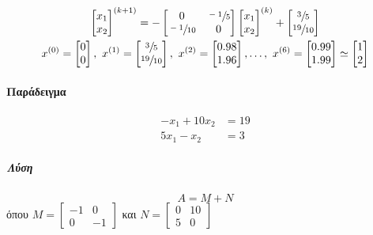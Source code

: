 \documentclass[11pt,a4paper,notitlepage,fleqn]{article}
\begin{document}
\begin{gather*}
	\left[\begin{matrix}
	x_1\\x_2
	\end{matrix}\right]^{(k+1)} = -\left[\begin{matrix}
	0 & \sfrac{-1}{5} \\ \sfrac{-1}{10} & 0
	\end{matrix}\right] \left[\begin{matrix}
	x_1\\x_2
	\end{matrix}\right]^{(k)} + \left[\begin{matrix}
	\sfrac{3}{5} \\ \sfrac{19}{10} 
	\end{matrix}\right] \\
	x^{(0)} = \left[\begin{matrix}
	0\\0
	\end{matrix}\right],\ x^{(1)}=\left[\begin{matrix}
	\sfrac{3}{5} \\ \sfrac{19}{10} 
	\end{matrix}\right],\ x^{(2)}=\left[\begin{matrix}
	0.98\\1.96
	\end{matrix}\right],\dots,\ x^{(6)}=\left[\begin{matrix}
	0.99\\1.99
	\end{matrix}\right] \simeq \left[\begin{matrix}
	1 \\ 2
	\end{matrix}\right]
\end{gather*}

\paragraph{Παράδειγμα}
\begin{align*}
	-x_1+10x_2 &= 19 \\
	5x_1-x_2 &= 3
\end{align*}
\subparagraph{Λύση}
\[
A = M + N
\]
όπου \( M = \left[\begin{matrix}
-1&0\\0&-1
\end{matrix}\right] \) και \( N=\left[\begin{matrix}
0&10\\5&0
\end{matrix}\right] \)
\end{document}
